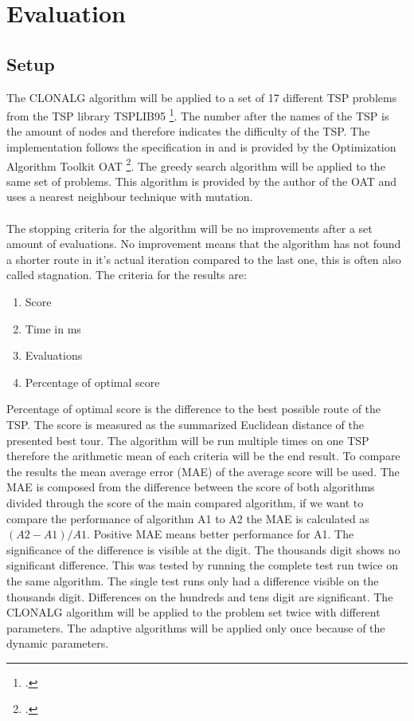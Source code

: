 \chapter{Evaluation}
\label{chap:eva}
\section{Setup}
The CLONALG algorithm will be applied to a set of 17 different TSP problems from the TSP library TSPLIB95 \footcite[https://www.iwr.uni-heidelberg.de/groups/comopt/software/TSPLIB95/]{tsplib}. The number after the names of the TSP is the amount of nodes and therefore indicates the difficulty of the TSP. The implementation follows the specification in \cite{DEC02} and is provided by the Optimization Algorithm Toolkit OAT \footcite[http://optalgtoolkit.sourceforge.net/]{oat}. The greedy search algorithm will be applied to the same set of problems. This algorithm is provided by the author of the OAT and uses a nearest neighbour technique with mutation.\\\\ 
The stopping criteria for the algorithm will be no improvements after a set amount of evaluations. No improvement means that the algorithm has not found a shorter route in it's actual iteration compared to the last one, this is often also called stagnation. 
The criteria for the results are:
\begin{enumerate}
	\item 	Score
	\item 	Time in ms
	\item 	Evaluations	
	\item  	Percentage of optimal score
\end{enumerate}
Percentage of optimal score is the difference to the best possible route of the TSP. The score is measured as the summarized Euclidean distance of the presented best tour. The algorithm will be run multiple times on one TSP therefore the arithmetic mean of each criteria will be the end result. To compare the results the mean average error (MAE) of the average score will be used. The MAE is composed from the difference between the score of both algorithms divided through the score of the main compared algorithm, if we want to compare the performance of algorithm A1 to A2 the MAE is calculated as $(A2-A1)/A1$. Positive MAE means better performance for A1. The significance of the difference is visible at the digit. The thousands digit shows no significant difference. This was tested by running the complete test run twice on the same algorithm. The single test runs only had a difference visible on the thousands digit. Differences on the hundreds and tens digit are significant. The CLONALG algorithm will be applied to the problem set twice with different parameters. The adaptive algorithms will be applied only once because of the dynamic parameters.
